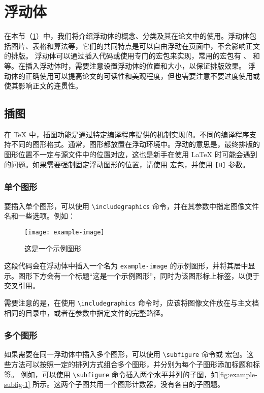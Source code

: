 \section{浮动体}\label{sec:float}

在本节（\cref{sec:float}）中，我们将介绍浮动体的概念、分类及其在论文中的使用。浮动体包括图片、表格和算法等，它们的共同特点是可以自由浮动在页面中，不会影响正文的排版。
浮动体可以通过插入代码或使用专门的宏包来实现，常用的宏包有 、 和  等。在插入浮动体时，需要注意设置浮动体的位置和大小，以保证排版效果。
浮动体的正确使用可以提高论文的可读性和美观程度，但也需要注意不要过度使用或使其影响正文的连贯性。

\subsection{插图}

在 \TeX{} 中，插图功能是通过特定编译程序提供的机制实现的。不同的编译程序支持不同的图形格式。通常，图形都放置在浮动环境中。浮动的意思是，最终排版的图形位置不一定与源文件中的位置对应，这也是新手在使用 \LaTeX{} 时可能会遇到的问题。如果需要强制固定浮动图形的位置，请使用  宏包，并使用 \texttt{[H]} 参数。

\subsubsection{单个图形}

要插入单个图形，可以使用 \verb|\includegraphics| 命令，并在其参数中指定图像文件名和一些选项。例如：

\begin{figure}[!htb]
  \centering
  \texttt{[image: example-image]}
  \caption{这是一个示例图形}
  \label{fig:example}
\end{figure}

这段代码会在浮动体中插入一个名为 \verb|example-image| 的示例图形，并将其居中显示。图形下方会有一个标题“这是一个示例图形”，同时为该图形标上标签，以便于交叉引用。

需要注意的是，在使用 \verb|\includegraphics| 命令时，应该将图像文件放在与主文档相同的目录中，或者在参数中指定文件的完整路径。

\subsubsection{多个图形}

如果需要在同一浮动体中插入多个图形，可以使用 \verb|\subfigure| 命令或  宏包。这些方法可以按照一定的排列方式组合多个图形，并分别为每个子图形添加标题和标签。
例如，可以使用 \verb|\subfigure| 命令插入两个水平并列的子图，如\cref{fig:example-subfig-1} 所示。这两个子图共用一个图形计数器，没有各自的子图题。

